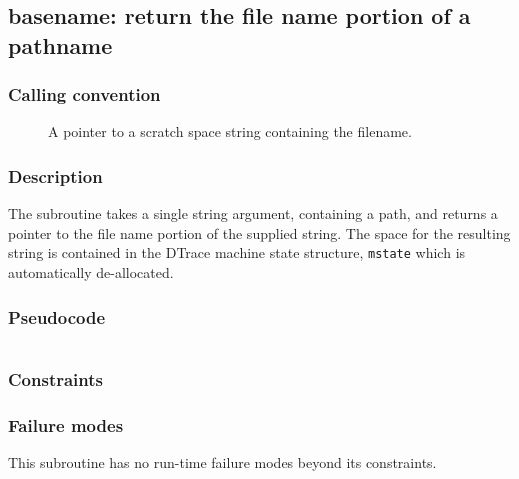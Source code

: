 \clearpage
{}
{}
\label{subr:basename}
\subsection*{basename: return the file name portion of a pathname}

\subsubsection*{Calling convention}

\begin{description}
\item[] A pointer to a scratch space string containing
  the filename.
\end{description}

\subsubsection*{Description}

The  subroutine takes a single string argument,
containing a path, and returns a pointer to the file name portion of
the supplied string.  The space for the resulting string is contained
in the DTrace machine state structure, \verb|mstate| which is
automatically de-allocated.
\subsubsection*{Pseudocode}

\begin{verbatim}
\end{verbatim}

\subsubsection*{Constraints}

\subsubsection*{Failure modes}

This subroutine has no run-time failure modes beyond its constraints.
